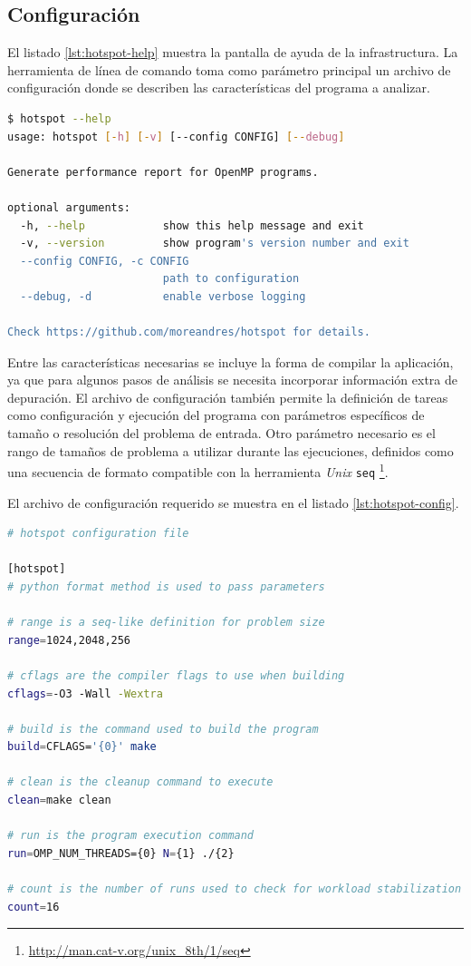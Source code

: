 \documentclass[a4paper]{report}
\begin{document}
\subsection{Configuración}

El listado \ref{lst:hotspot-help} muestra la pantalla de ayuda de la infrastructura.
La herramienta de línea de comando toma como parámetro principal un archivo de configuración donde se describen las características del programa a analizar. 

\begin{lstlisting}[language=bash, caption={Ayuda de {\tt hotspot}}, label={lst:hotspot-help}]
$ hotspot --help
usage: hotspot [-h] [-v] [--config CONFIG] [--debug]

Generate performance report for OpenMP programs.

optional arguments:
  -h, --help            show this help message and exit
  -v, --version         show program's version number and exit
  --config CONFIG, -c CONFIG
                        path to configuration
  --debug, -d           enable verbose logging

Check https://github.com/moreandres/hotspot for details.
\end{lstlisting}

\bigskip

Entre las características necesarias se incluye la forma de compilar la aplicación, ya que para algunos pasos de análisis se necesita incorporar información extra de depuración. El archivo de configuración también permite la definición de tareas como configuración y ejecución del programa con parámetros específicos de tamaño o resolución del problema de entrada. Otro parámetro necesario es el rango de tamaños de problema a utilizar durante las ejecuciones, definidos como una secuencia de formato compatible con la herramienta {\it Unix} {\tt seq} \footnote{\href{http://man.cat-v.org/unix\_8th/1/seq}{http://man.cat-v.org/unix\_8th/1/seq}}.

\bigskip

El archivo de configuración requerido se muestra en el listado \ref{lst:hotspot-config}.

\begin{lstlisting}[language=bash, caption={Configuración de {\tt hotspot}}, label={lst:hotspot-config}]
# hotspot configuration file

[hotspot]
# python format method is used to pass parameters

# range is a seq-like definition for problem size
range=1024,2048,256

# cflags are the compiler flags to use when building
cflags=-O3 -Wall -Wextra

# build is the command used to build the program
build=CFLAGS='{0}' make

# clean is the cleanup command to execute
clean=make clean

# run is the program execution command
run=OMP_NUM_THREADS={0} N={1} ./{2}

# count is the number of runs used to check for workload stabilization
count=16
\end{lstlisting}
\end{document}
